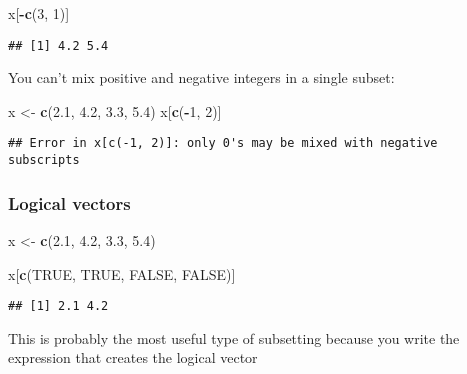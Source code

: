 \documentclass[
]{book}
\newenvironment{Shaded}{\begin{snugshade}}{\end{snugshade}}
\newcommand{\DecValTok}[1]{\textcolor[rgb]{0.00,0.00,0.81}{#1}}
\newcommand{\FloatTok}[1]{\textcolor[rgb]{0.00,0.00,0.81}{#1}}
\newcommand{\KeywordTok}[1]{\textcolor[rgb]{0.13,0.29,0.53}{\textbf{#1}}}
\newcommand{\NormalTok}[1]{#1}
\newcommand{\OperatorTok}[1]{\textcolor[rgb]{0.81,0.36,0.00}{\textbf{#1}}}
\newcommand{\OtherTok}[1]{\textcolor[rgb]{0.56,0.35,0.01}{#1}}
\newcommand{\StringTok}[1]{\textcolor[rgb]{0.31,0.60,0.02}{#1}}
\begin{document}
\begin{Shaded}
\begin{Highlighting}[]
\NormalTok{x[}\OperatorTok{{-}}\KeywordTok{c}\NormalTok{(}\DecValTok{3}\NormalTok{, }\DecValTok{1}\NormalTok{)]}
\end{Highlighting}
\end{Shaded}

\begin{verbatim}
## [1] 4.2 5.4
\end{verbatim}

You can't mix positive and negative integers in a single subset:

\begin{Shaded}
\begin{Highlighting}[]
\NormalTok{x \textless{}{-}}\StringTok{ }\KeywordTok{c}\NormalTok{(}\FloatTok{2.1}\NormalTok{, }\FloatTok{4.2}\NormalTok{, }\FloatTok{3.3}\NormalTok{, }\FloatTok{5.4}\NormalTok{)}
\NormalTok{x[}\KeywordTok{c}\NormalTok{(}\OperatorTok{{-}}\DecValTok{1}\NormalTok{, }\DecValTok{2}\NormalTok{)]}
\end{Highlighting}
\end{Shaded}

\begin{verbatim}
## Error in x[c(-1, 2)]: only 0's may be mixed with negative subscripts
\end{verbatim}

\hypertarget{logical-vectors}{%
\subsubsection{Logical vectors}\label{logical-vectors}}

\begin{Shaded}
\begin{Highlighting}[]
\NormalTok{x \textless{}{-}}\StringTok{ }\KeywordTok{c}\NormalTok{(}\FloatTok{2.1}\NormalTok{, }\FloatTok{4.2}\NormalTok{, }\FloatTok{3.3}\NormalTok{, }\FloatTok{5.4}\NormalTok{)}

\NormalTok{x[}\KeywordTok{c}\NormalTok{(}\OtherTok{TRUE}\NormalTok{, }\OtherTok{TRUE}\NormalTok{, }\OtherTok{FALSE}\NormalTok{, }\OtherTok{FALSE}\NormalTok{)]}
\end{Highlighting}
\end{Shaded}

\begin{verbatim}
## [1] 2.1 4.2
\end{verbatim}

This is probably the most useful type of subsetting because you write the expression that creates the logical vector
\end{document}
